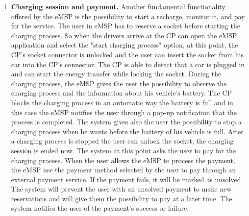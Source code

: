 \documentclass{Configuration_Files/PoliMi3i_thesis}
\begin{document}
\begin{enumerate}
    \item \textbf{Charging session and payment.} \newline
    Another fundamental functionality offered by the eMSP is the possibility to start a recharge, monitor it, and pay for the service. 
    The user in eMSP has to reserve a socket before starting the charging process. So when the drivers arrive at the CP can open the eMSP application and select the "start charging process" option, at this point, the CP’s socket connector is unlocked and the user can insert the socket from his car into the CP’s connector. The CP is able to detect that a car is plugged in and can start the energy transfer while locking the socket. During the charging process, the eMSP gives the user the possibility to observe the charging process and the information about his vehicle’s battery. The CP blocks the charging process in an automatic way the battery is full and in this case the eMSP notifies the user through a pop-up notification that the process is completed. The system gives also the user the possibility to stop a charging process when he wants before the battery of his vehicle is full.
    After a charging process is stopped the user can unlock the socket; the charging session is ended now. The system at this point asks the user to pay for the charging process. When the user allows the eMSP to process the payment, the eMSP use the payment method selected by the user to pay through an external payment service. If the payment fails, it will be marked as unsolved. The system will prevent the user with an unsolved payment to make new reservations and will give them the possibility to pay at a later time.
    The system notifies the user of the payment's success or failure.\newline
   

\end{enumerate}
\end{document}

